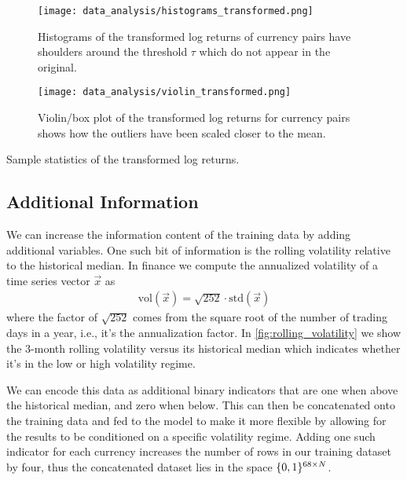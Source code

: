 \begin{figure}[!htb]
    \begin{center}
        \texttt{[image: data\_analysis/histograms\_transformed.png]}
    \end{center}
    \caption{Histograms of the transformed log returns of currency pairs have shoulders around the threshold \( \tau \) which do not appear in the original.}
    \label{fig:histograms_transformed}
\end{figure}
\begin{figure}[!htb]
    \begin{center}
        \texttt{[image: data\_analysis/violin\_transformed.png]}
    \end{center}
    \caption{Violin/box plot of the transformed log returns for currency pairs shows how the outliers have been scaled closer to the mean.}
    \label{fig:violin_transformed}
\end{figure}
\begin{table}[!htb]
    \centering
    \begin{adjustbox}{max width=\textwidth}
        
    \end{adjustbox}
    \caption{Sample statistics of the transformed log returns.}
    \label{tbl:data_log_returns_transformed_stats}
\end{table}

\subsection{Additional Information}
We can increase the information content of the training data by adding additional variables.
One such bit of information is the rolling volatility relative to the historical median.
In finance we compute the annualized volatility of a time series vector \( \vec{x} \) as
\begin{align}
    \text{vol}(\vec{x}) = \sqrt{252} \cdot \text{std}(\vec{x})
\end{align}
where the factor of \( \sqrt{252} \) comes from the square root of the number of trading days in a year, i.e., it's the annualization factor.
In \cref{fig:rolling_volatility} we show the 3-month rolling volatility versus its historical median which indicates whether it's in the low or high volatility regime.

We can encode this data as additional binary indicators that are one when above the historical median, and zero when below.
This can then be concatenated onto the training data and fed to the model to make it more flexible by allowing for the results to be conditioned on a specific volatility regime.
Adding one such indicator for each currency increases the number of rows in our training dataset by four, thus the concatenated dataset lies in the space \( \{0,1\}^{68 \times N} \).

